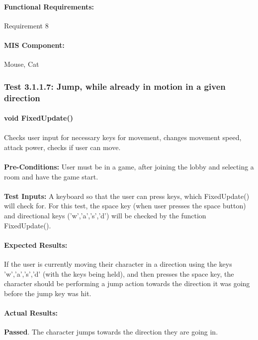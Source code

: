 \documentclass{article}
\begin{document}
    \paragraph{Functional Requirements:} Requirement 8
    \paragraph{MIS Component:} Mouse, Cat 
    
    \subsubsection{Test 3.1.1.7: Jump, while already in motion in a given direction}
    \paragraph{}\textbf{void FixedUpdate()}
    \paragraph{} Checks user input for necessary keys for movement, changes movement speed, attack power, checks if user can move.
    \paragraph{}\textbf{Pre-Conditions:} User must be in a game, after joining the lobby and selecting a room and have the game start.
    \paragraph{}\textbf{Test Inputs:} A keyboard so that the user can press keys, which FixedUpdate() will check for. For this test, the space key (when user presses the space button) and directional keys ('w','a','s','d') will be checked by the function FixedUpdate(). 
    \paragraph{Expected Results:} If the user is currently moving their character in a direction using the keys 'w','a','s','d' (with the keys being held), and then presses the space key, the character should be performing a jump action towards the direction it was going before the jump key was hit. 
    \paragraph{Actual Results:} \textbf{Passed}. The character jumps towards the direction they are going in.
\end{document}
